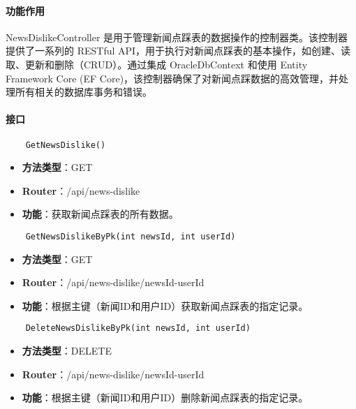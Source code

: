 \paragraph{功能作用}

NewsDislikeController 是用于管理新闻点踩表的数据操作的控制器类。该控制器提供了一系列的 RESTful API，用于执行对新闻点踩表的基本操作，如创建、读取、更新和删除（CRUD）。通过集成 OracleDbContext 和使用 Entity Framework Core (EF Core)，该控制器确保了对新闻点踩数据的高效管理，并处理所有相关的数据库事务和错误。

\paragraph{接口}

\begin{verbatim}
	GetNewsDislike()
\end{verbatim}

\begin{itemize}
	\item \textbf{方法类型}：GET
	\item \textbf{Router}：/api/news-dislike
	\item \textbf{功能}：获取新闻点踩表的所有数据。
\end{itemize}

\begin{verbatim}
	GetNewsDislikeByPk(int newsId, int userId)
\end{verbatim}

\begin{itemize}
	\item \textbf{方法类型}：GET
	\item \textbf{Router}：/api/news-dislike/{newsId}-{userId}
	\item \textbf{功能}：根据主键（新闻ID和用户ID）获取新闻点踩表的指定记录。
\end{itemize}

\begin{verbatim}
	DeleteNewsDislikeByPk(int newsId, int userId)
\end{verbatim}

\begin{itemize}
	\item \textbf{方法类型}：DELETE
	\item \textbf{Router}：/api/news-dislike/{newsId}-{userId}
	\item \textbf{功能}：根据主键（新闻ID和用户ID）删除新闻点踩表的指定记录。
\end{itemize}

